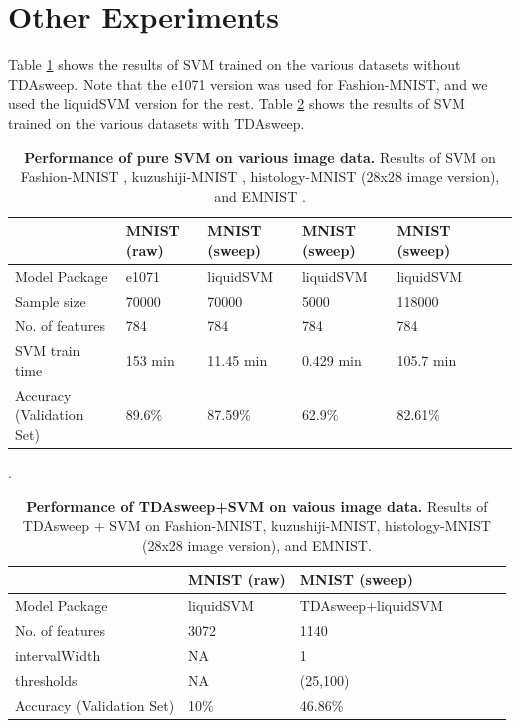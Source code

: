 \documentclass{article}
\begin{document}
\section{Other Experiments}
Table \ref{comp_res_noT} shows the results of SVM trained on the various datasets without TDAsweep. Note that the e1071 version was used for Fashion-MNIST, and we used the liquidSVM version for the rest. Table \ref{comp_res_T} shows the results of SVM trained on the various datasets with TDAsweep.

\begin{table}[!ht]
\centering
\caption{{\bf Performance of pure SVM on various image data.} Results of SVM on Fashion-MNIST \cite{xiao2017/online}, kuzushiji-MNIST \cite{clanuwat2018deep}, histology-MNIST (28x28 image version), and EMNIST \cite{cohen_afshar_tapson_schaik_2017}.}
\begin{tabular}{|l|l|l|l|l|l|l|}
\hline
\multicolumn{1}{|l|}{} & \multicolumn{1}{|l|}{\bf MNIST (raw)} & \multicolumn{1}{|l|}{\bf MNIST (sweep)} & \multicolumn{1}{|l|}{\bf MNIST (sweep)}  & \multicolumn{1}{|l|}{\bf MNIST (sweep)}\\ \hline
Model Package & e1071 & liquidSVM & liquidSVM & liquidSVM \\ \hline
Sample size & 70000 & 70000 & 5000 & 118000  \\ \hline
No. of features & 784 & 784 & 784 & 784  \\ \hline
SVM train time & 153 min & 11.45 min & 0.429 min & 105.7 min  \\ \hline
Accuracy (Validation Set) & 89.6\% & 87.59\% & 62.9\% & 82.61\%  \\ \hline
\end{tabular}
\label{comp_res_noT}
\end{table}


\begin{table}[!ht]
\centering
\caption{{\bf Performance of TDAsweep+SVM on vaious image data.} Results of TDAsweep + SVM on Fashion-MNIST, kuzushiji-MNIST, histology-MNIST (28x28 image version), and EMNIST.}.
\begin{tabular}{|l|l|l|l|l|l|l|}
\hline
\multicolumn{1}{|l|}{} & \multicolumn{1}{|l|}{\bf MNIST (raw)} & \multicolumn{1}{|l|}{\bf MNIST (sweep)}\\ \hline
Model Package & liquidSVM & TDAsweep+liquidSVM  \\ \hline
No. of features & 3072 & 1140   \\ \hline
intervalWidth & NA & 1   \\ \hline
thresholds & NA & (25,100)   \\ \hline
Accuracy (Validation Set) & 10\% & 46.86\%  \\ \hline
\end{tabular}
\label{comp_res_T}
\end{table}
\end{document}
